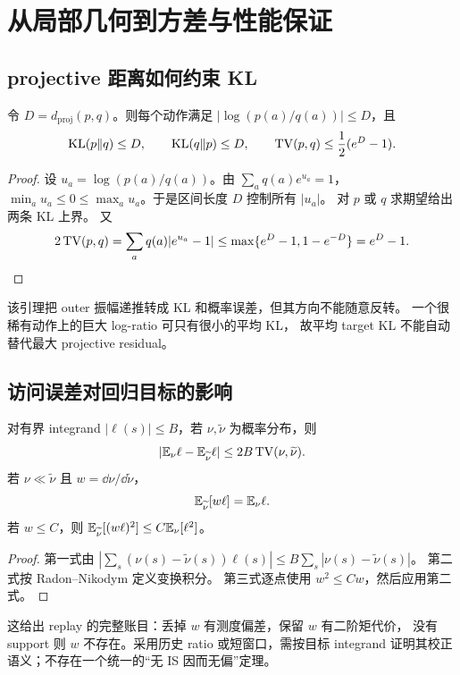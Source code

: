 \chapter{从局部几何到方差与性能保证}
\label{chap:guarantees}

\section{projective 距离如何约束 KL}
\begin{lemma}[从振幅到概率距离]\label{lem:proj-kl}
令 $D=d_{\mathrm{proj}}(p,q)$。则每个动作满足
$|\log(p(a)/q(a))|\le D$，且
\[
 \operatorname{KL}(p\Vert q)\le D,\qquad \operatorname{KL}(q\Vert p)\le D,\qquad
 \operatorname{TV}(p,q)\le\frac12(e^D-1).
\]
\end{lemma}
\begin{proof}
设 $u_a=\log(p(a)/q(a))$。由 $\sum_a q(a)e^{u_a}=1$，
$\min_a u_a\le0\le\max_a u_a$。于是区间长度 $D$ 控制所有 $|u_a|$。
对 $p$ 或 $q$ 求期望给出两条 KL 上界。
又
\[
 2\operatorname{TV}(p,q)=\sum_a q(a)|e^{u_a}-1|
 \le\max\{e^D-1,1-e^{-D}\}=e^D-1.
\]
\end{proof}
该引理把 outer 振幅递推转成 KL 和概率误差，但其方向不能随意反转。
一个很稀有动作上的巨大 log-ratio 可只有很小的平均 KL，
故平均 target KL 不能自动替代最大 projective residual。

\section{访问误差对回归目标的影响}
\begin{theorem}
对有界 integrand $|\ell(s)|\le B$，若 $\nu,\widetilde\nu$ 为概率分布，则
\[
 |\mathbb{E}_\nu\ell-\mathbb{E}_{\widetilde\nu}\ell|\le2B\operatorname{TV}(\nu,\widetilde\nu).
\]
若 $\nu\ll\widetilde\nu$ 且 $w=\dd\nu/\dd\widetilde\nu$，
\[
 \mathbb{E}_{\widetilde\nu}[w\ell]=\mathbb{E}_\nu\ell.
\]
若 $w\le C$，则 $\mathbb{E}_{\widetilde\nu}[(w\ell)^2]\le C\mathbb{E}_\nu[\ell^2]$。
\end{theorem}
\begin{proof}
第一式由
$|\sum_s(\nu(s)-\widetilde\nu(s))\ell(s)|
 \le B\sum_s|\nu(s)-\widetilde\nu(s)|$。
第二式按 Radon--Nikodym 定义变换积分。
第三式逐点使用 $w^2\le Cw$，然后应用第二式。
\end{proof}
这给出 replay 的完整账目：丢掉 $w$ 有测度偏差，保留 $w$ 有二阶矩代价，
没有 support 则 $w$ 不存在。采用历史 ratio 或短窗口，需按目标 integrand
证明其校正语义；不存在一个统一的“无 IS 因而无偏”定理。

